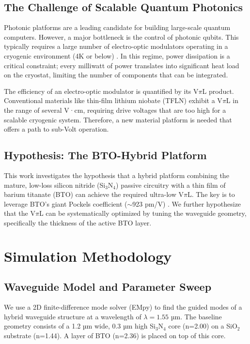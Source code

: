 \documentclass[12pt, a4paper, numbers]{report}
\begin{document}
\section{The Challenge of Scalable Quantum Photonics}
Photonic platforms are a leading candidate for building large-scale quantum computers. However, a major bottleneck is the control of photonic qubits. This typically requires a large number of electro-optic modulators operating in a cryogenic environment (4K or below) \cite{TFLNreview}. In this regime, power dissipation is a critical constraint; every milliwatt of power translates into significant heat load on the cryostat, limiting the number of components that can be integrated.

The efficiency of an electro-optic modulator is quantified by its V$\pi$L product. Conventional materials like thin-film lithium niobate (TFLN) exhibit a V$\pi$L in the range of several V·cm, requiring drive voltages that are too high for a scalable cryogenic system. Therefore, a new material platform is needed that offers a path to sub-Volt operation.

\section{Hypothesis: The BTO-Hybrid Platform}
This work investigates the hypothesis that a hybrid platform combining the mature, low-loss silicon nitride (Si$_3$N$_4$) passive circuitry with a thin film of barium titanate (BTO) can achieve the required ultra-low V$\pi$L. The key is to leverage BTO's giant Pockels coefficient ($\sim$923 pm/V) \cite{BTO}. We further hypothesize that the V$\pi$L can be systematically optimized by tuning the waveguide geometry, specifically the thickness of the active BTO layer.

\chapter{Simulation Methodology}
\section{Waveguide Model and Parameter Sweep}
We use a 2D finite-difference mode solver (EMpy) to find the guided modes of a hybrid waveguide structure at a wavelength of $\lambda = 1.55$ µm. The baseline geometry consists of a 1.2 µm wide, 0.3 µm high Si$_3$N$_4$ core (n=2.00) on a SiO$_2$ substrate (n=1.44). A layer of BTO (n=2.36) is placed on top of this core.
\end{document}
